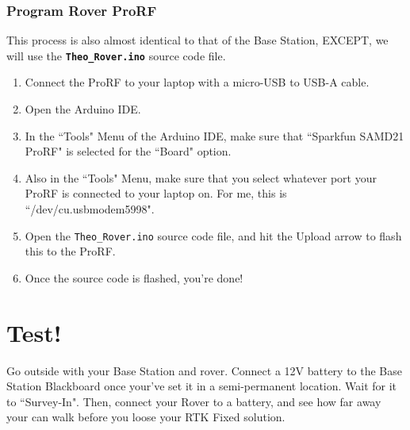 \documentclass{article}%
\begin{document}
\subsubsection{Program Rover ProRF}
This process is also almost identical to that of the Base Station, EXCEPT, we will use the \textbf{\texttt{Theo\_Rover.ino}} source code file.
\begin{enumerate}
	\item Connect the ProRF to your laptop with a micro-USB to USB-A cable.
	\item Open the Arduino IDE.
	\item In the ``Tools" Menu of the Arduino IDE, make sure that ``Sparkfun SAMD21 ProRF" is selected for the ``Board" option.
	\item Also in the ``Tools" Menu, make sure that you select whatever port your ProRF is connected to your laptop on.  For me, this is ``/dev/cu.usbmodem5998".
	\item Open the \texttt{Theo\_Rover.ino} source code file, and hit the Upload arrow to flash this to the ProRF.
	\item Once the source code is flashed, you're done!
\end{enumerate}

\section{Test!}
Go outside with your Base Station and rover.  Connect a 12V battery to the Base Station Blackboard once your've set it in a semi-permanent location.  Wait for it to ``Survey-In". Then, connect your Rover to a battery, and see how far away your can walk before you loose your RTK Fixed solution.
\end{document}
